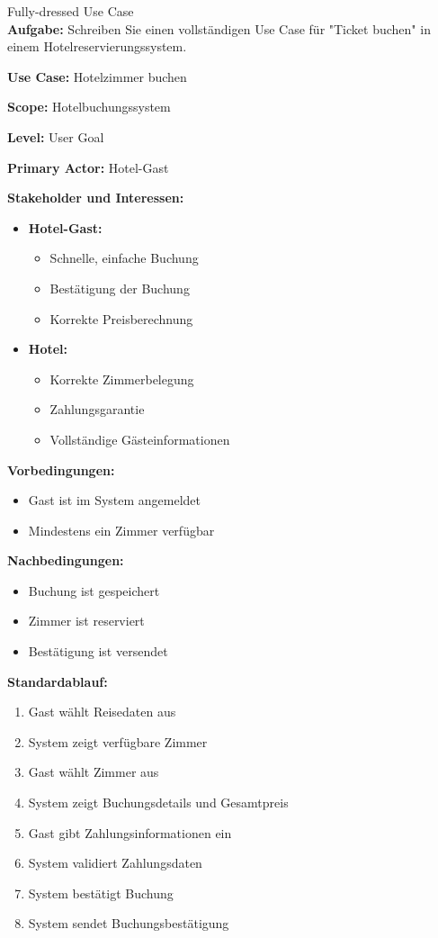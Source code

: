 \begin{example2}{Fully-dressed Use Case}\\
\textbf{Aufgabe:} Schreiben Sie einen vollständigen Use Case für "Ticket buchen" in einem Hotelreservierungssystem.

\textbf{Use Case:} Hotelzimmer buchen

\textbf{Scope:} Hotelbuchungssystem

\textbf{Level:} User Goal

\textbf{Primary Actor:} Hotel-Gast

\textbf{Stakeholder und Interessen:}
\begin{itemize}
    \item \textbf{Hotel-Gast:}
    \begin{itemize}
        \item Schnelle, einfache Buchung
        \item Bestätigung der Buchung
        \item Korrekte Preisberechnung
    \end{itemize}
    \item \textbf{Hotel:}
    \begin{itemize}
        \item Korrekte Zimmerbelegung
        \item Zahlungsgarantie
        \item Vollständige Gästeinformationen
    \end{itemize}
\end{itemize}

\textbf{Vorbedingungen:}
\begin{itemize}
    \item Gast ist im System angemeldet
    \item Mindestens ein Zimmer verfügbar
\end{itemize}

\textbf{Nachbedingungen:}
\begin{itemize}
    \item Buchung ist gespeichert
    \item Zimmer ist reserviert
    \item Bestätigung ist versendet
\end{itemize}

\textbf{Standardablauf:}
\begin{enumerate}
    \item Gast wählt Reisedaten aus
    \item System zeigt verfügbare Zimmer
    \item Gast wählt Zimmer aus
    \item System zeigt Buchungsdetails und Gesamtpreis
    \item Gast gibt Zahlungsinformationen ein
    \item System validiert Zahlungsdaten
    \item System bestätigt Buchung
    \item System sendet Buchungsbestätigung
\end{enumerate}


\end{example2}
